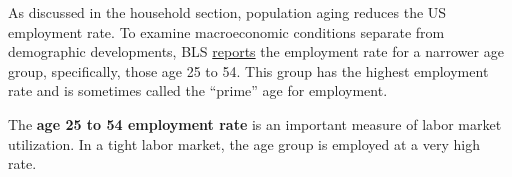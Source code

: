\begin{minipage}{0.76\textwidth}
\small As discussed in the household section, population aging reduces the US employment rate. To examine macroeconomic conditions separate from demographic developments, BLS \href{https://data.bls.gov/timeseries/LNS12300000}{reports} the employment rate for a narrower age group, specifically, those age 25 to 54. This group has the highest employment rate and is sometimes called the ``prime'' age for employment. 

The \textbf{age 25 to 54 employment rate} is an important measure of labor market utilization. In a tight labor market, the age group is employed at a very high rate.  
\vspace{1mm}

\\
\end{minipage}
\newpage


